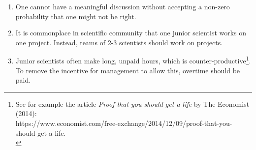 \begin{enumerate}[nosep]%
    \item One cannot have a meaningful discussion without accepting a non-zero probability that one might not be right.
    \item 
    It is commonplace in scientific community that 
    one junior scientist works on one project. 
    Instead, 
    teams of 2-3 scientists should work on projects. 
    \item 
    Junior scientists often make long, unpaid hours, which is counter-productive\footnote{
        See for example the article \textit{Proof that you should get a life} by The Economist (2014): \\
        https://www.economist.com/free-exchange/2014/12/09/proof-that-you-should-get-a-life.\\ 
    }.
    To remove the incentive for management to allow this, overtime should be paid.

\end{enumerate}
